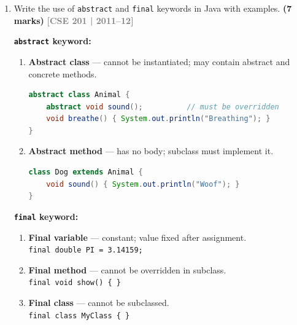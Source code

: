 \documentclass[12pt,a3paper]{article}
\newcommand{\yr}[1]{\hfill\textcolor{gray}{\small\textbf{[#1]}}}
\newcommand{\mk}[1]{\textcolor{orange!70!black}{\small\textbf{(#1 marks)}}}
\begin{document}
\begin{enumerate}
\begin{tcolorbox}[enhanced,breakable,ansbox,
  colback=cD!4,colframe=cD,boxrule=0.8pt,arc=5pt,
  title={\textbf{Answer --- Abstract Class vs.\ Interface}},
  fonttitle=\bfseries\color{white},colbacktitle=cD]
\end{tcolorbox}

\item Write the use of \texttt{abstract} and \texttt{final} keywords in Java with examples. \mk{7}
\yr{CSE 201 | 2011--12}

\begin{tcolorbox}[enhanced,breakable,ansbox,
  colback=cD!4,colframe=cD,boxrule=0.8pt,arc=5pt,
  title={\textbf{Answer --- \texttt{abstract} and \texttt{final} Keywords in Java}},
  fonttitle=\bfseries\color{white},colbacktitle=cD]

\textbf{\texttt{abstract} keyword:}

\begin{enumerate}[label=\textbf{\arabic*.}]
  \item \textbf{Abstract class} --- cannot be instantiated; may contain
    abstract and concrete methods.
\begin{lstlisting}[language=Java]
abstract class Animal {
    abstract void sound();          // must be overridden
    void breathe() { System.out.println("Breathing"); }
}
\end{lstlisting}

  \item \textbf{Abstract method} --- has no body; subclass must implement it.
\begin{lstlisting}[language=Java]
class Dog extends Animal {
    void sound() { System.out.println("Woof"); }
}
\end{lstlisting}
\end{enumerate}

\medskip
\textbf{\texttt{final} keyword:}

\begin{enumerate}[label=\textbf{\arabic*.}]
  \item \textbf{Final variable} --- constant; value fixed after assignment.\\
    \texttt{final double PI = 3.14159;}

  \item \textbf{Final method} --- cannot be overridden in subclass.\\
    \texttt{final void show() \{ \}}

  \item \textbf{Final class} --- cannot be subclassed.\\
    \texttt{final class MyClass \{ \}}
\end{enumerate}


\end{tcolorbox}
\end{enumerate}
\end{document}

